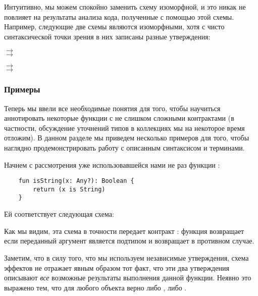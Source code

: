 Интуитивно, мы можем спокойно заменить схему изоморфной, и это никак не повлияет на результаты анализа кода, полученные с помощью этой схемы. Например, следующие две схемы являются изоморфными, хотя с чисто синтаксической точки зрения в них записаны разные утверждения:

{
       $\rightarrow$  \\
     $\rightarrow$  \\
}{}

\bigskip

{
     $\rightarrow$  \\
       $\rightarrow$ 
}
{}



\subsubsection{Примеры}

Теперь мы ввели все необходимые понятия для того, чтобы научиться аннотировать некоторые функции с не слишком сложными контрактами (в частности, обсуждение уточнений типов в коллекциях мы на некоторое время отложим). В данном разделе мы приведем несколько примеров для того, чтобы наглядно продемонстрировать работу с описанным синтаксисом и терминами.

Начнем с рассмотрения уже использовавшейся нами не раз функции :

\begin{verbatim}
    fun isString(x: Any?): Boolean {
        return (x is String)
    }
\end{verbatim}

Ей соответствует следующая схема:

{}

Как мы видим, эта схема в точности передает контракт : функция возвращает  если переданный аргумент является подтипом  и возвращает  в противном случае. 

Заметим, что в силу того, что мы используем независимые утверждения, схема эффектов не отражает явным образом тот факт, что эти два утверждения описывают \emph{все} возможные результаты выполнения данной функции. Неявно это выражено тем, что для любого объекта  верно либо , либо . 


